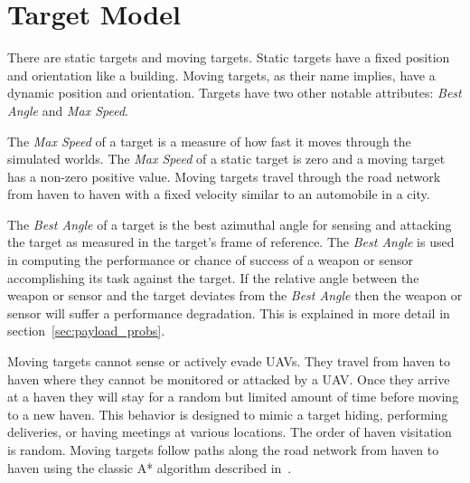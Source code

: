 \section{Target Model}
\label{sec:target_model}
There are static targets and moving targets.  Static targets have a fixed position and orientation like a building.  Moving targets, as their name implies, have a dynamic position and orientation.  Targets have two other notable attributes: \textit{Best Angle} and \textit{Max Speed}.

The \textit{Max Speed} of a target is a measure of how fast it moves through the simulated worlds.  The \textit{Max Speed} of a static target is zero and a moving target has a non-zero positive value.  Moving targets travel through the road network from haven to haven with a fixed velocity similar to an automobile in a city.

The \textit{Best Angle} of a target is the best azimuthal angle for sensing and attacking the target as measured in the target's frame of reference.  The \textit{Best Angle} is used in computing the performance or chance of success of a weapon or sensor accomplishing its task against the target.  If the relative angle between the weapon or sensor and the target deviates from the \textit{Best Angle} then the weapon or sensor will suffer a performance degradation.  This is explained in more detail in section~\ref{sec:payload_probs}. %

Moving targets cannot sense or actively evade UAVs.  They travel from haven to haven where they cannot be monitored or attacked by a UAV.  Once they arrive at a haven they will stay for a random but limited amount of time before moving to a new haven.  This behavior is designed to mimic a target hiding, performing deliveries, or having meetings at various locations.  The order of haven visitation is random.  Moving targets follow paths along the road network from haven to haven using the classic A* algorithm described in~\citet{wiki:astar}.

